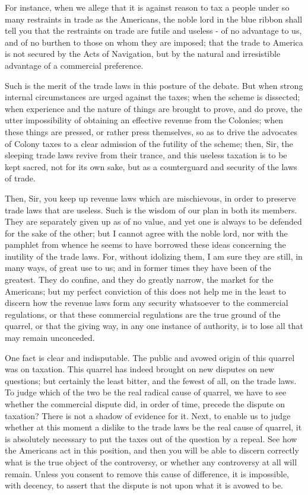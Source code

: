 For instance, when we allege that it is against reason to tax a people under so many restraints in trade as the Americans, the noble lord in the blue ribbon shall tell you that the restraints on trade are futile and useless - of no advantage to us, and of no burthen to those on whom they are imposed; that the trade to America is not secured by the Acts of Navigation, but by the natural and irresistible advantage of a commercial preference.\par

Such is the merit of the trade laws in this posture of the debate. But when strong internal circumstances are urged against the taxes; when the scheme is dissected; when experience and the nature of things are brought to prove, and do prove, the utter impossibility of obtaining an effective revenue from the Colonies; when these things are pressed, or rather press themselves, so as to drive the advocates of Colony taxes to a clear admission of the futility of the scheme; then, Sir, the sleeping trade laws revive from their trance, and this useless taxation is to be kept sacred, not for its own sake, but as a counterguard and security of the laws of trade.\par

Then, Sir, you keep up revenue laws which are mischievous, in order to preserve trade laws that are useless. Such is the wisdom of our plan in both its members. They are separately given up as of no value, and yet one is always to be defended for the sake of the other; but I cannot agree with the noble lord, nor with the pamphlet from whence he seems to have borrowed these ideas concerning the inutility of the trade laws. For, without idolizing them, I am sure they are still, in many ways, of great use to us; and in former times they have been of the greatest. They do confine, and they do greatly narrow, the market for the Americans; but my perfect conviction of this does not help me in the least to discern how the revenue laws form any security whatsoever to the commercial regulations, or that these commercial regulations are the true ground of the quarrel, or that the giving way, in any one instance of authority, is to lose all that may remain unconceded.\par

One fact is clear and indisputable. The public and avowed origin of this quarrel was on taxation. This quarrel has indeed brought on new disputes on new questions; but certainly the least bitter, and the fewest of all, on the trade laws. To judge which of the two be the real radical cause of quarrel, we have to see whether the commercial dispute did, in order of time, precede the dispute on taxation? There is not a shadow of evidence for it. Next, to enable us to judge whether at this moment a dislike to the trade laws be the real cause of quarrel, it is absolutely necessary to put the taxes out of the question by a repeal. See how the Americans act in this position, and then you will be able to discern correctly what is the true object of the controversy, or whether any controversy at all will remain. Unless you consent to remove this cause of difference, it is impossible, with decency, to assert that the dispute is not upon what it is avowed to be.\par

